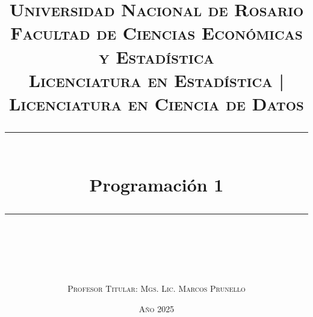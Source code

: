 \newcommand{\horrule}[1]{\rule{\linewidth}{#1}}
\title{
	\normalfont \normalsize
	\textsc{
		Universidad Nacional de Rosario \\
		Facultad de Ciencias Económicas y Estadística \\
		Licenciatura en Estadística | Licenciatura en Ciencia de Datos
	} \\ [25pt]
	\Large \horrule{2pt} \\[0.4cm]
	\huge \textbf{Programación 1} \\
	\horrule{2pt} \\[0.5cm]
}

\author{
	\\[10cm]
	\textsc{Profesor Titular: Mgs. Lic. Marcos Prunello}
}

\date{
  \textsc{Año 2025}
}
